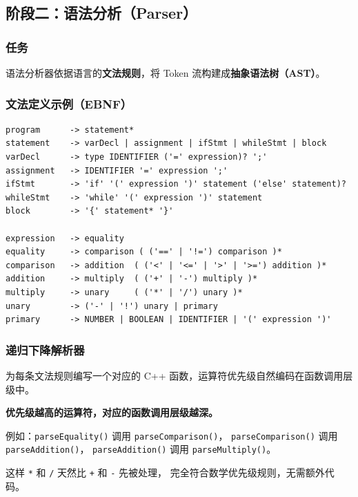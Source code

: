 \documentclass[12pt, a4paper]{ctexart}
\begin{document}
\subsection{阶段二：语法分析（Parser）}

\subsubsection{任务}

语法分析器依据语言的\textbf{文法规则}，将 Token 流构建成\textbf{抽象语法树（AST）}。

\subsubsection{文法定义示例（EBNF）}

\begin{lstlisting}[caption={简单语言的 EBNF 文法}]
program      -> statement*
statement    -> varDecl | assignment | ifStmt | whileStmt | block
varDecl      -> type IDENTIFIER ('=' expression)? ';'
assignment   -> IDENTIFIER '=' expression ';'
ifStmt       -> 'if' '(' expression ')' statement ('else' statement)?
whileStmt    -> 'while' '(' expression ')' statement
block        -> '{' statement* '}'

expression   -> equality
equality     -> comparison ( ('==' | '!=') comparison )*
comparison   -> addition  ( ('<' | '<=' | '>' | '>=') addition )*
addition     -> multiply  ( ('+' | '-') multiply )*
multiply     -> unary     ( ('*' | '/') unary )*
unary        -> ('-' | '!') unary | primary
primary      -> NUMBER | BOOLEAN | IDENTIFIER | '(' expression ')'
\end{lstlisting}

\subsubsection{递归下降解析器}

为每条文法规则编写一个对应的 C++ 函数，运算符优先级自然编码在函数调用层级中。

\begin{warnbox}[运算符优先级的实现原理]
\textbf{优先级越高的运算符，对应的函数调用层级越深。}

例如：\texttt{parseEquality()} 调用 \texttt{parseComparison()}，
\texttt{parseComparison()} 调用 \texttt{parseAddition()}，
\texttt{parseAddition()} 调用 \texttt{parseMultiply()}。

这样 \texttt{*} 和 \texttt{/} 天然比 \texttt{+} 和 \texttt{-} 先被处理，
完全符合数学优先级规则，无需额外代码。
\end{warnbox}
\end{document}
